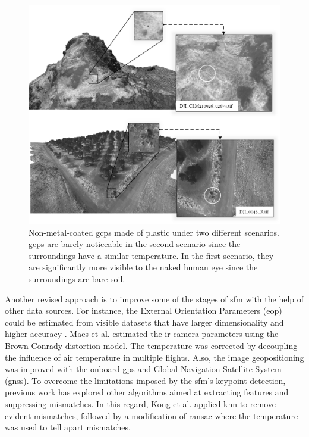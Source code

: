 \begin{figure}[ht]
	\includegraphics[width=\textwidth]{figs/context/gcps.png}
	\caption{Non-metal-coated \acrshort{gcp}s made of plastic under two different scenarios. \acrshort{gcp}s are barely noticeable in the second scenario since the surroundings have a similar temperature. In the first scenario, they are significantly more visible to the naked human eye since the surroundings are bare soil. }
    \label{fig:gcps_thermography}
\end{figure}

Another revised approach is to improve some of the stages of \acrshort{sfm} with the help of other data sources. For instance, the External Orientation Parameters (\acrshort{eop}) could be estimated from visible datasets that have larger dimensionality and higher accuracy \cite{jo_dense_2021}. Maes et al. \cite{maes_optimizing_2017} estimated the \acrshort{ir} camera parameters using the Brown-Conrady distortion model. The temperature was corrected by decoupling the influence of air temperature in multiple flights. Also, the image geopositioning was improved with the onboard \acrshort{gps} and Global Navigation Satellite System (\acrshort{gnss}). To overcome the limitations imposed by the \acrshort{sfm}'s keypoint detection, previous work has explored other algorithms aimed at extracting features and suppressing mismatches. In this regard, Kong et al. \cite{kong_3-d_2018} applied \acrshort{knn} to remove evident mismatches, followed by a modification of \acrshort{ransac} where the temperature was used to tell apart mismatches. 

